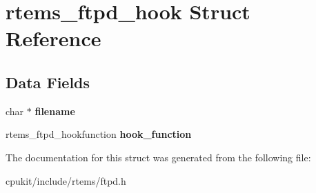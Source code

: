 \hypertarget{structrtems__ftpd__hook}{}\section{rtems\+\_\+ftpd\+\_\+hook Struct Reference}
\label{structrtems__ftpd__hook}
\subsection*{Data Fields}
\begin{DoxyCompactItemize}
\item 
\mbox{\label{structrtems__ftpd__hook_a6cd15262c273d6f6f9634c06a4aaeec6}} 
char $\ast$ {\bfseries filename}
\item 
\mbox{\label{structrtems__ftpd__hook_a0c238c328026677994767811f12962db}} 
rtems\+\_\+ftpd\+\_\+hookfunction {\bfseries hook\+\_\+function}
\end{DoxyCompactItemize}


The documentation for this struct was generated from the following file\+:\begin{DoxyCompactItemize}
\item 
cpukit/include/rtems/ftpd.\+h\end{DoxyCompactItemize}
